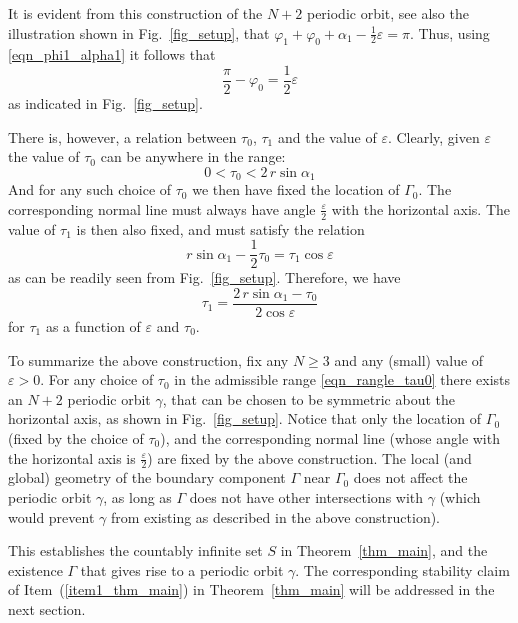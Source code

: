 \documentclass{amsart}
\theoremstyle{plain} %
\begin{document}
It is evident from this construction of the $N+2$ periodic orbit,
see also the illustration shown in Fig.~\ref{fig_setup}, that
$\varphi_1 + \varphi_0 + \alpha_1 - \frac{1}{2}\varepsilon = \pi$.
Thus, using \eqref{eqn_phi1_alpha1} it follows that
\begin{equation}
  \label{eqn_phi0}
  \frac{\pi}{2} - \varphi_0 = \frac{1}{2}\varepsilon
\end{equation}
as indicated in Fig.~\ref{fig_setup}.

There is, however, a relation between $\tau_0$, $\tau_1$
and the value of $\varepsilon$. Clearly, given $\varepsilon$ the value of
$\tau_0$ can be anywhere in the range:
\begin{equation}
  \label{eqn_rangle_tau0}
  0 < \tau_0 < 2\,r \sin\alpha_1
\end{equation}
And for any such choice of $\tau_0$ we then have fixed the location
of $\Gamma_0$. The corresponding normal line must always have
angle $\frac{\varepsilon}{2}$ with the horizontal axis.
The value of $\tau_1$ is then also fixed, and must satisfy
the relation
\begin{equation*}
  r \sin\alpha_1 - \frac{1}{2} \tau_0
  =
  \tau_1 \cos\varepsilon
\end{equation*}
as can be readily seen from Fig.~\ref{fig_setup}. Therefore, we have
\begin{equation}
  \label{eqn_tau1}
  \tau_1
  =
  \frac{ 2\,r \sin\alpha_1 - \tau_0 }{ 2 \cos\varepsilon }
\end{equation}
for $\tau_1$ as a function of $\varepsilon$ and $\tau_0$.

To summarize the above construction, fix any $N \geq 3$
and any (small) value of $\varepsilon>0$. For any choice of
$\tau_0$ in the admissible range \eqref{eqn_rangle_tau0}
there exists an $N+2$ periodic orbit $\gamma$,
that can be chosen to be symmetric
about the horizontal axis, as shown in Fig.~\ref{fig_setup}.
Notice that only the location of $\Gamma_0$ (fixed
by the choice of $\tau_0$), and the corresponding normal line
(whose angle with the horizontal axis is $\frac{\varepsilon}{2}$)
are fixed by the above construction. The local (and global) geometry
of the boundary component $\Gamma$ near $\Gamma_0$
does not affect the periodic orbit $\gamma$, as long as $\Gamma$
does not have other intersections with $\gamma$ (which would prevent
$\gamma$ from existing as described in the above construction).

This establishes the countably infinite set $S$ in
Theorem~\ref{thm_main}, and the existence $\Gamma$ that
gives rise to a periodic orbit $\gamma$. The corresponding stability
claim of Item~(\ref{item1_thm_main}) in Theorem~\ref{thm_main} will be
addressed in the next section.
\end{document}
